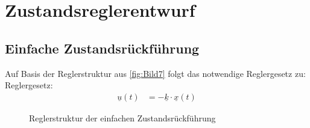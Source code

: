\section{Zustandsreglerentwurf} \label{sec:Zustandsreglerentwurf}

\subsection{Einfache Zustandsrückführung} \label{sec:Einfach}

Auf Basis der Reglerstruktur aus \autoref{fig:Bild7} folgt das notwendige Reglergesetz zu:\\
\newline
Reglergesetz:
\begin{align}
    \underline{u}(t) &= -\underline{k}\cdot\underline{x}(t)
    \label{eq:Gleichung19}
\end{align}

\begin{figure}[H]
   \centering
   \caption[Reglerstruktur der einfache Zustandsrückführung]{Reglerstruktur der einfachen Zustandsrückführung}
   \label{fig:Bild7}
\end{figure}


